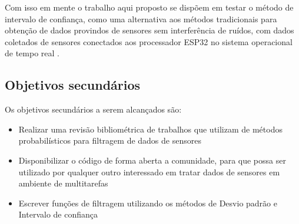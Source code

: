 Com isso em mente o trabalho aqui proposto se dispõem em testar o método de intervalo de confiança, como uma alternativa aos métodos tradicionais para obtenção de dados provindos de sensores sem interferência de ruídos, com dados coletados de sensores conectados aos processador ESP32 no sistema operacional de tempo real \cite{Zephyr}.

\subsection{Objetivos secundários}
Os objetivos secundários a serem alcançados são:
\begin{itemize}
\item Realizar uma revisão bibliométrica de trabalhos que utilizam de métodos probabilísticos para filtragem de dados de sensores
\item Disponibilizar o código de forma aberta a comunidade, para que possa ser utilizado por qualquer outro interessado em tratar dados de sensores em ambiente de multitarefas
\item Escrever funções de filtragem utilizando os métodos de Desvio padrão e Intervalo de confiança
\end{itemize}





